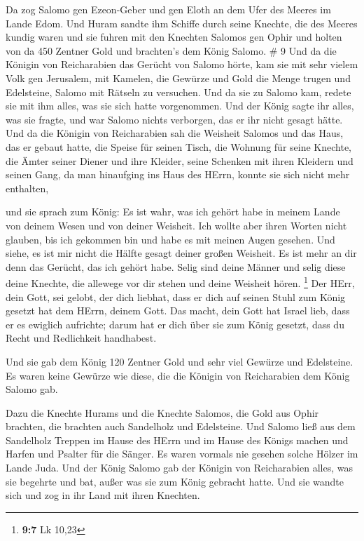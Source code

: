  Da zog Salomo gen Ezeon-Geber und gen Eloth an dem Ufer
des Meeres im Lande Edom.  Und Huram sandte ihm Schiffe
durch seine Knechte, die des Meeres kundig waren und sie fuhren mit den
Knechten Salomos gen Ophir und holten von da 450 Zentner Gold und
brachten's dem König Salomo. \# 9  Und da die Königin von
Reicharabien das Gerücht von Salomo hörte, kam sie mit sehr vielem Volk
gen Jerusalem, mit Kamelen, die Gewürze und Gold die Menge trugen und
Edelsteine, Salomo mit Rätseln zu versuchen. Und da sie zu Salomo kam,
redete sie mit ihm alles, was sie sich hatte vorgenommen. 
Und der König sagte ihr alles, was sie fragte, und war Salomo nichts
verborgen, das er ihr nicht gesagt hätte.  Und da die
Königin von Reicharabien sah die Weisheit Salomos und das Haus, das er
gebaut hatte,  die Speise für seinen Tisch, die Wohnung für
seine Knechte, die Ämter seiner Diener und ihre Kleider, seine Schenken
mit ihren Kleidern und seinen Gang, da man hinaufging ins Haus des
HErrn, konnte sie sich nicht mehr enthalten,

 und sie sprach zum König: Es ist wahr, was ich gehört habe
in meinem Lande von deinem Wesen und von deiner Weisheit. 
Ich wollte aber ihren Worten nicht glauben, bis ich gekommen bin und
habe es mit meinen Augen gesehen. Und siehe, es ist mir nicht die Hälfte
gesagt deiner großen Weisheit. Es ist mehr an dir denn das Gerücht, das
ich gehört habe.  Selig sind deine Männer und selig diese
deine Knechte, die allewege vor dir stehen und deine Weisheit hören.
\footnote{\textbf{9:7} Lk 10,23}  Der HErr, dein Gott, sei
gelobt, der dich liebhat, dass er dich auf seinen Stuhl zum König
gesetzt hat dem HErrn, deinem Gott. Das macht, dein Gott hat Israel
lieb, dass er es ewiglich aufrichte; darum hat er dich über sie zum
König gesetzt, dass du Recht und Redlichkeit handhabest.

 Und sie gab dem König 120 Zentner Gold und sehr viel
Gewürze und Edelsteine. Es waren keine Gewürze wie diese, die die
Königin von Reicharabien dem König Salomo gab.

 Dazu die Knechte Hurams und die Knechte Salomos, die Gold
aus Ophir brachten, die brachten auch Sandelholz und Edelsteine.
 Und Salomo ließ aus dem Sandelholz Treppen im Hause des
HErrn und im Hause des Königs machen und Harfen und Psalter für die
Sänger. Es waren vormals nie gesehen solche Hölzer im Lande Juda.
 Und der König Salomo gab der Königin von Reicharabien
alles, was sie begehrte und bat, außer was sie zum König gebracht hatte.
Und sie wandte sich und zog in ihr Land mit ihren Knechten.

